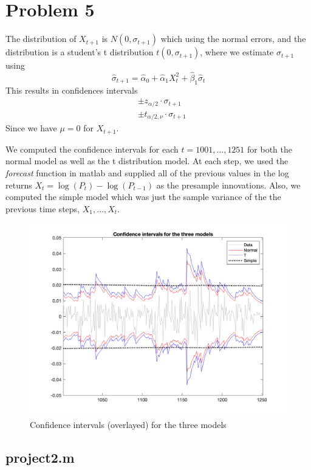 \documentclass{article}
\begin{document}
\section*{Problem 5}
The distribution of $X_{t + 1}$ is $N(0, \sigma_{t+1})$ which using the normal errors,
and the distribution is a student's t distribution $t(0, \sigma_{t + 1})$,
where we estimate $\sigma_{t + 1}$ using
$$
\hat{\sigma}_{t + 1} = \hat{\alpha}_0 + \hat{\alpha}_1 X_t^2 + \hat{\beta}_1 \hat{\sigma}_t
$$
This results in confidences intervals
\begin{align*}
&\pm z_{\alpha/2} \cdot \sigma_{t + 1}\\
&\pm t_{\alpha/2, \nu} \cdot \sigma_{t + 1}
\end{align*}
Since we have $\mu = 0$ for $X_{t + 1}$.

We computed the confidence intervals for each $t = 1001,\ldots, 1251$ for both the normal model as well as the t distribution model.
At each step, we used the \textit{forecast} function in matlab and supplied all of the previous values in the log returns $X_t = \log(P_t) - \log(P_{t - 1})$ as the presample innovations.
Also, we computed the simple model which was just the sample variance of the the previous time steps, $X_1, \ldots, X_t$.

\begin{figure}[H]
\includegraphics[width=16cm]{plots/conf_ints_overlay.png}
\centering
\caption{Confidence intervals (overlayed) for the three models}
\label{fig:conf_intervals}
\end{figure}

\begin{appendices}

\subsection{project2.m}


\end{appendices}

%
%
\end{document}
